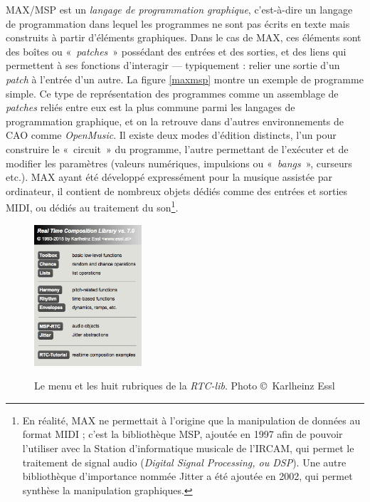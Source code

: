 \documentclass[a4paper,12pt]{article}
\newcommand{\guill}[1]{«~#1~»}
\begin{document}
MAX/MSP est un \emph{langage de programmation graphique}, c'est-à-dire un langage de programmation dans lequel les programmes ne sont pas écrits en texte mais construits à partir d'éléments graphiques. Dans le cas de MAX, ces éléments sont des boîtes ou \guill{\emph{patches}} possédant des entrées et des sorties, et des liens qui permettent à ses fonctions d'interagir --- typiquement : relier une sortie d'un \emph{patch} à l'entrée d'un autre. La figure \ref{maxmsp} montre un exemple de programme simple. Ce type de représentation des programmes comme un assemblage de \emph{patches} reliés entre eux est la plus commune parmi les langages de programmation graphique, et on la retrouve dans d'autres environnements de CAO comme \emph{OpenMusic}. Il existe deux modes d'édition distincts, l'un pour construire le \guill{circuit} du programme, l'autre permettant de l'exécuter et de modifier les paramètres (valeurs numériques, impulsions ou \guill{\emph{bangs}}, curseurs etc.). MAX ayant été développé expressément pour la musique assistée par ordinateur, il contient de nombreux objets dédiés comme des entrées et sorties MIDI, ou dédiés au traitement du son\footnote{En réalité, MAX ne permettait à l'origine que la manipulation de données au format MIDI ; c'est la bibliothèque MSP, ajoutée en 1997 afin de pouvoir l'utiliser avec la Station d'informatique musicale de l'IRCAM, qui permet le traitement de signal audio (\emph{Digital Signal Processing, ou DSP}). Une autre bibliothèque d'importance nommée Jitter a été ajoutée en 2002, qui permet synthèse la manipulation graphiques.}.

\begin{figure}[h!]
\begin{center}
\includegraphics[width=4cm]{images/rtcmenu.png}
\label{rtcmenu}
\caption{Le menu et les huit rubriques de la \emph{RTC-lib}. Photo \copyright~Karlheinz Essl}
\end{center}
\end{figure}
\end{document}
